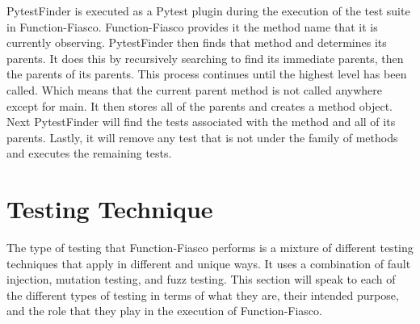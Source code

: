 PytestFinder is executed as a Pytest plugin during the execution of the test suite in Function-Fiasco. Function-Fiasco provides it the method name that it is currently observing. PytestFinder then finds that method and determines its parents. It does this by recursively searching to find its immediate parents, then the parents of its parents. This process continues until the highest level has been called. Which means that the current parent method is not called anywhere except for main. It then stores all of the parents and creates a method object. Next PytestFinder will find the tests associated with the method and all of its parents. Lastly, it will remove any test that is not under the family of methods and executes the remaining tests.

\section{Testing Technique}
The type of testing that Function-Fiasco performs is a mixture of different testing techniques that apply in different and unique ways. It uses a combination of fault injection, mutation testing, and fuzz testing. This section will speak to each of the different types of testing in terms of what they are, their intended purpose, and the role that they play in the execution of Function-Fiasco.

